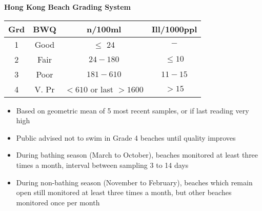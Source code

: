 \documentclass{article}
\newcommand{\headingsmall}[1]{{\small\textbf{#1}}}
\begin{document}
\begin{multicols*}{4}
\headingsmall{Hong Kong Beach Grading System}
\begin{center}\begin{tabular}{c|c|c|c}
Grd & BWQ   & n/100ml                & Ill/1000ppl \\
\hline
1   & Good  & $\leq$ 24              & $-$         \\
2   & Fair  & $24-180$               & $\leq 10$   \\
3   & Poor  & $181-610$              & $11 - 15$   \\
4   & V. Pr & $<610$ or last $>1600$ & $> 15$
\end{tabular}\end{center}
\begin{itemize} \itemsep -0.5em
    \item Based on geometric mean of 5 most recent samples, or if last reading
        very high
    \item Public advised not to swim in Grade 4 beaches until quality improves
    \item During bathing season (March to October), beaches monitored at least
        three times a month, interval between sampling 3 to 14 days
    \item During non-bathing season (November to February), beaches which
        remain open still monitored at least three times a month, but other
        beaches monitored once per month
\end{itemize}


\end{multicols*}
\end{document}
